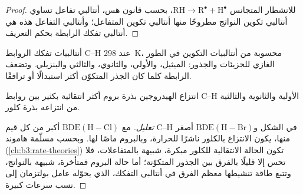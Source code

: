 \begin{proof}
للانشطار المتجانس $\mathrm{RH \to R^\bullet + H^\bullet}$، بحسب قانون هس، أنتالبي تفاعل تساوي أنتالبي تكوين النواتج
مطروحًا منها أنتالبي تكوين المتفاعل؛ وأنتالبي التفاعل هذه هي أنتالبي تفكك
الرابطة بحكم التعريف.
\end{proof}

\begin{omfigure}

{\small أنتالبيات تفكك الروابط C--H عند \qty{298}{K}، محسوبة من أنتالبيات التكوين
في الطور الغازي للجزيئات والجذور: الميثيل، والأولي،
والثانوي، والثالثي والبنزيلي. وتضعف الرابطة كلما كان الجذر المتكوّن
أكثر استبدالًا أو ترافقًا.}
\end{omfigure}

\begin{proposition}\label{prop:b3:radicals-carbenes:halogenation-selectivity}
انتزاع الهيدروجين بذرة بروم أكثر انتقائية بكثير بين روابط C--H الأولية
والثانوية والثالثية من انتزاعه بذرة كلور.
\end{proposition}

\begin{proof}[تعليل]
مع $\mathrm{BDE(H{-}Cl)}$ أكبر من كل قيم C--H في الشكل و$\mathrm{BDE(H{-}Br)}$ أصغر منها،
يكون الانتزاع بالكلور ناشرًا للحرارة، وبالبروم ماصًا لها. وبحسب مسلّمة
هاموند (\cref{ch:b3:rate-theories}) تكون الحالة الانتقالية للكلور مبكرة،
شبيهة بالمتفاعلات، فلا تحس إلا قليلًا بالفرق بين الجذور المتكوّنة؛
أما حالة البروم فمتأخرة، شبيهة بالنواتج، وتتبع طاقة تنشيطها معظم
الفرق في أنتالبي التفكك، الذي يحوّله عامل بولتزمان إلى نسب سرعات كبيرة.
\end{proof}

